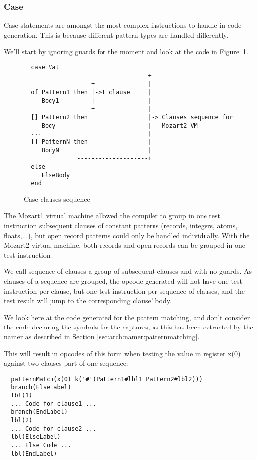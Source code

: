 \documentclass[a4paper]{memoir}
\begin{document}
\subsubsection{Case}\label{sec:arch:codegen:case}
Case statements are amongst the most complex instructions to handle in code generation. This is because different pattern types are handled differently. 


We'll start by ignoring guards for the moment and look at the code in Figure~\ref{fig:clauses}.

\begin{figure}[ht]
\begin{verbatim}
  case Val
                -------------------+
                ---+               |
  of Pattern1 then |->1 clause     |
     Body1         |               |
                ---+               |
  [] Pattern2 then                 |-> Clauses sequence for 
     Body                          |   Mozart2 VM
  ...                              |
  [] PatternN then                 |
     BodyN                         |
               --------------------+
  else
     ElseBody
  end

\end{verbatim}
\caption{Case clauses sequence}
\label{fig:clauses}
\end{figure}


The Mozart1 virtual machine allowed the compiler to group in one test instruction subsequent clauses of
constant patterns (records, integers, atoms, floats,...), but open
record patterns could only be handled individually.
With the Mozart2 virtual machine, both records and open records can be grouped in one test instruction.

We call sequence of clauses  a group of subsequent clauses and with no guards.
As clauses of a sequence are grouped, the opcode generated will not
have one test instruction per clause, but one test instruction
per sequence of clauses, and the test result will jump to the corresponding clause' body.

We look here at the code generated for the pattern matching, and don't consider
the code declaring the symbols for the captures, as this has been extracted by
the namer as described in Section \ref{sec:arch:namer:patternmatching}.

This will result in opcodes of this form when testing the value in register x(0) against two clauses part of one sequence:
\begin{lstlisting}
  patternMatch(x(0) k('#'(Pattern1#lbl1 Pattern2#lbl2)))
  branch(ElseLabel)
  lbl(1)
  ... Code for clause1 ...
  branch(EndLabel)
  lbl(2)
  ... Code for clause2 ...
  lbl(ElseLabel)
  ... Else Code ...
  lbl(EndLabel)
\end{lstlisting}
\end{document}
